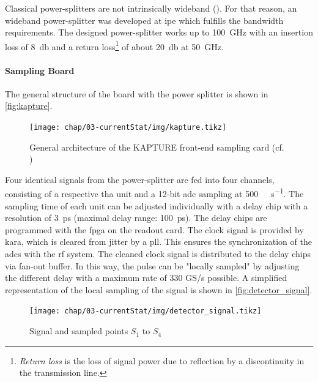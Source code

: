 Classical power-splitters are not intrinsically wideband (\cite{caselle2014}). For that reason, an wideband power-splitter was developed at \gls{ipe} which fulfills the bandwidth requirements. The designed power-splitter works up to \SI{100}{\giga \hertz} with an insertion loss of \SI{8}{\decibel} and a return loss\footnote{\textit{Return loss} is the loss of signal power due to reflection by a discontinuity in the transmission line.} of about \SI{20}{\decibel} at \SI{50}{\giga \hertz}.\cite{caselle2014}

\paragraph{Sampling Board}
The general structure of the board with the power splitter is shown in \autoref{fig:kapture}. 
\begin{figure}[tbh]
	\centering
	\texttt{[image: chap/03-currentStat/img/kapture.tikz]}
	\caption[General architecture of the KAPTURE system]{General architecture of the KAPTURE front-end sampling card (cf. \cite[p.2]{caselleKAP})}
	\label{fig:kapture}
\end{figure}

Four identical signals from the power-splitter are fed into four channels, consisting of a respective \gls{tha} unit and a 12-bit \gls{adc} sampling at \SI{500}{\mega\sample\per\second}. The sampling time of each unit can be adjusted individually with a delay chip with a resolution of \SI{3}{\pico \second} (maximal delay range: \SI{100}{\pico \second}). The delay chips are programmed with the \gls{fpga} on the readout card.
The clock signal is provided by \gls{kara}, which is cleared from jitter by a \gls{pll}. This ensures the synchronization of the \glspl{adc} with the \gls{rf} system. The cleaned clock signal is distributed to the delay chips via fan-out buffer. \cite{caselleKAP}
In this way, the pulse can be "locally sampled" by adjusting the different delay with a maximum rate of 330 GS/s possible. 
A simplified representation of the local sampling of the signal is shown in \autoref{fig:detector_signal}.
\begin{figure}[tbh]
	\centering
	\texttt{[image: chap/03-currentStat/img/detector\_signal.tikz]}
	\caption{Signal and sampled points $S_1$ to $S_4$}
	\label{fig:detector_signal}
\end{figure}

